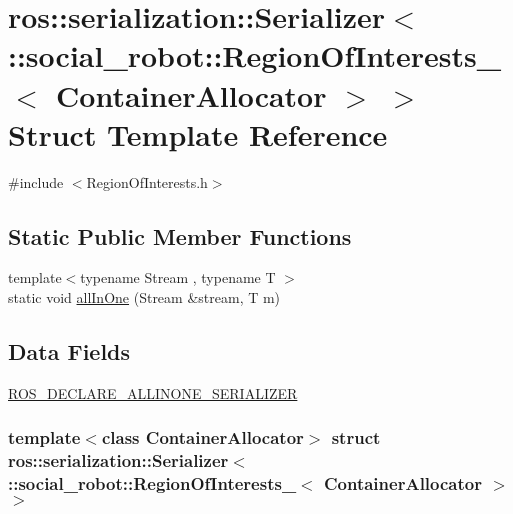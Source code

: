 \hypertarget{structros_1_1serialization_1_1Serializer_3_01_1_1social__robot_1_1RegionOfInterests___3_01ContainerAllocator_01_4_01_4}{
\section{ros::serialization::Serializer$<$ ::social\_\-robot::RegionOfInterests\_\-$<$ ContainerAllocator $>$ $>$ Struct Template Reference}
\label{structros_1_1serialization_1_1Serializer_3_01_1_1social__robot_1_1RegionOfInterests___3_01ContainerAllocator_01_4_01_4}
}


{\ttfamily \#include $<$RegionOfInterests.h$>$}

\subsection*{Static Public Member Functions}
\begin{DoxyCompactItemize}
\item 
{\footnotesize template$<$typename Stream , typename T $>$ }\\static void \hyperlink{structros_1_1serialization_1_1Serializer_3_01_1_1social__robot_1_1RegionOfInterests___3_01ContainerAllocator_01_4_01_4_aa0bac552a1bd0f861cf8799a39d5e0df}{allInOne} (Stream \&stream, T m)
\end{DoxyCompactItemize}
\subsection*{Data Fields}
\begin{DoxyCompactItemize}
\item 
\hyperlink{structros_1_1serialization_1_1Serializer_3_01_1_1social__robot_1_1RegionOfInterests___3_01ContainerAllocator_01_4_01_4_aea3e7ff08267371e6c24a0748eec1170}{ROS\_\-DECLARE\_\-ALLINONE\_\-SERIALIZER}
\end{DoxyCompactItemize}
\subsubsection*{template$<$class ContainerAllocator$>$ struct ros::serialization::Serializer$<$ ::social\_\-robot::RegionOfInterests\_\-$<$ ContainerAllocator $>$ $>$}



